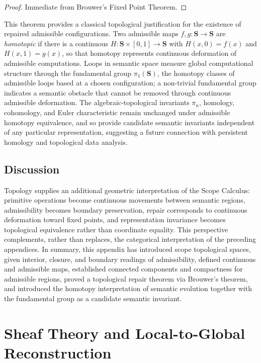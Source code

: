 \documentclass[11pt,twoside,openright]{book}
\numberwithin{equation}{chapter}
\theoremstyle{definition}
\theoremstyle{plain}
\theoremstyle{remark}
\theoremstyle{definition}
\newcommand{\Scope}{\mathbf{S}}
\begin{document}
\begin{proof}
Immediate from Brouwer's Fixed Point Theorem.
\end{proof}

This theorem provides a classical topological justification for the
existence of repaired admissible configurations. Two admissible maps
$f,g:\Scope\to\Scope$ are \emph{homotopic} if there is a continuous
$H:\Scope\times[0,1]\to\Scope$ with $H(x,0)=f(x)$ and $H(x,1)=g(x)$, so
that homotopy represents continuous deformation of admissible
computations. Loops in semantic space measure global computational
structure through the fundamental group $\pi_1(\Scope)$, the homotopy
classes of admissible loops based at a chosen configuration; a
non-trivial fundamental group indicates a semantic obstacle that cannot
be removed through continuous admissible deformation. The
algebraic-topological invariants $\pi_n$, homology, cohomology, and Euler
characteristic remain unchanged under admissible homotopy equivalence,
and so provide candidate semantic invariants independent of any
particular representation, suggesting a future connection with
persistent homology and topological data analysis.

\section{Discussion}

Topology supplies an additional geometric interpretation of the Scope
Calculus: primitive operations become continuous movements between
semantic regions, admissibility becomes boundary preservation, repair
corresponds to continuous deformation toward fixed points, and
representation invariance becomes topological equivalence rather than
coordinate equality. This perspective complements, rather than replaces,
the categorical interpretation of the preceding appendices. In summary,
this appendix has introduced scope topological spaces, given interior,
closure, and boundary readings of admissibility, defined continuous and
admissible maps, established connected components and compactness for
admissible regions, proved a topological repair theorem via Brouwer's
theorem, and introduced the homotopy interpretation of semantic evolution
together with the fundamental group as a candidate semantic invariant.

\chapter{Sheaf Theory and Local-to-Global Reconstruction}
\label{app:sheaf}
\end{document}
